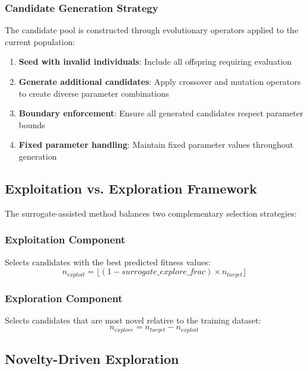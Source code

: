 \documentclass[12pt,a4paper]{article}
\begin{document}
\subsubsection{Candidate Generation Strategy}

The candidate pool is constructed through evolutionary operators applied to the current population:
\begin{enumerate}
\item \textbf{Seed with invalid individuals}: Include all offspring requiring evaluation
\item \textbf{Generate additional candidates}: Apply crossover and mutation operators to create diverse parameter combinations
\item \textbf{Boundary enforcement}: Ensure all generated candidates respect parameter bounds
\item \textbf{Fixed parameter handling}: Maintain fixed parameter values throughout generation
\end{enumerate}

\subsection{Exploitation vs. Exploration Framework}

The surrogate-assisted method balances two complementary selection strategies:

\subsubsection{Exploitation Component}
Selects candidates with the best predicted fitness values:
\begin{equation}
n_{exploit} = \lfloor (1 - surrogate\_explore\_frac) \times n_{target} \rfloor
\end{equation}

\subsubsection{Exploration Component}
Selects candidates that are most novel relative to the training dataset:
\begin{equation}
n_{explore} = n_{target} - n_{exploit}
\end{equation}

\subsection{Novelty-Driven Exploration}
\end{document}
